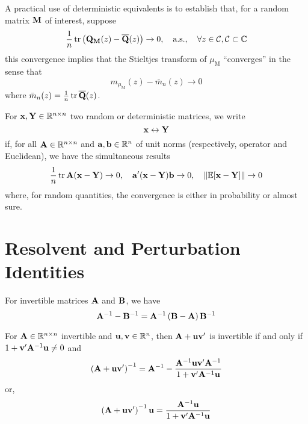 \begin{remark}
	A practical use of deterministic equivalents is to establish that, for a random matrix \(\mathbf{M}\) of interest, suppose
	\begin{equation*}
		\frac{1}{n}\operatorname{tr}\left(\mathbf{Q}_{\mathbf{M}}(z)-\overline{\mathbf{Q}}(z)\right)\rightarrow 0,\quad\text{a.s.},\quad\forall z\in\mathcal{C} ,\mathcal{C}\subset\mathbb{C}
	\end{equation*}
	this convergence implies that the Stieltjes transform of \(\mu_{\mathrm{M}}\) ``converges'' in the sense that
	\begin{equation*}
		m_{\mu_{\mathrm{M}}}(z)-\bar{m}_{n}(z)\rightarrow 0
	\end{equation*}
	where \(\bar{m}_{n}(z)=\frac{1}{n}\operatorname{tr}\overline{\mathbf{Q}}(z)\).
\end{remark}

\begin{definition}
	For \(\mathbf{x},\mathbf{Y}\in\mathbb{R}^{n \times n}\) two random or deterministic matrices, we write
	\begin{equation}
		\mathbf{x}\leftrightarrow\mathbf{Y}
	\end{equation}
	if, for all \(\mathbf{A}\in\mathbb{R}^{n\times n}\) and \(\mathbf{a},\mathbf{b}\in\mathbb{R}^{n}\) of unit norms (respectively, operator and Euclidean), we have the simultaneous results
	\begin{equation*}
		\frac{1}{n}\operatorname{tr}\mathbf{A}(\mathbf{x}-\mathbf{Y})\rightarrow 0,\quad \mathbf{a}^{\prime}(\mathbf{x}-\mathbf{Y})\mathbf{b}\rightarrow 0,\quad\|\mathbb{E}[\mathbf{x}-\mathbf{Y}]\|\rightarrow 0
	\end{equation*}
	where, for random quantities, the convergence is either in probability or almost sure.
\end{definition}

\section{Resolvent and Perturbation Identities}

\begin{lemma}\label{lem:resolvent-identity}
	For invertible matrices \(\mathbf{A}\) and \(\mathbf{B}\), we have
	\begin{equation}
		\mathbf{A}^{-1}-\mathbf{B}^{-1}=\mathbf{A}^{-1}\left(\mathbf{B}-\mathbf{A}\right)\mathbf{B}^{-1}
	\end{equation}
\end{lemma}

\begin{lemma}\label{lem:sherman-morrison}
	For \(\mathbf{A}\in\mathbb{R}^{n\times n}\) invertible and \(\mathbf{u},\mathbf{v}\in\mathbb{R}^{n}\), then \(\mathbf{A}+\mathbf{u}\mathbf{v}^{\prime}\) is invertible if and only if \(1+\mathbf{v}^{\prime}\mathbf{A}^{-1}\mathbf{u}\neq 0\) and
	\begin{equation}
		\left(\mathbf{A}+\mathbf{u}\mathbf{v}^{\prime}\right)^{-1}=\mathbf{A}^{-1}-\frac{\mathbf{A}^{-1}\mathbf{u}\mathbf{v}^{\prime}\mathbf{A}^{-1}}{1+\mathbf{v}^{\prime}\mathbf{A}^{-1}\mathbf{u}}
	\end{equation}
	or,
	\begin{equation}
		\left(\mathbf{A}+\mathbf{u}\mathbf{v}^{\prime}\right)^{-1}\mathbf{u}=\frac{\mathbf{A}^{-1}\mathbf{u}}{1+\mathbf{v}^{\prime}\mathbf{A}^{-1}\mathbf{u}}
	\end{equation}
\end{lemma}


